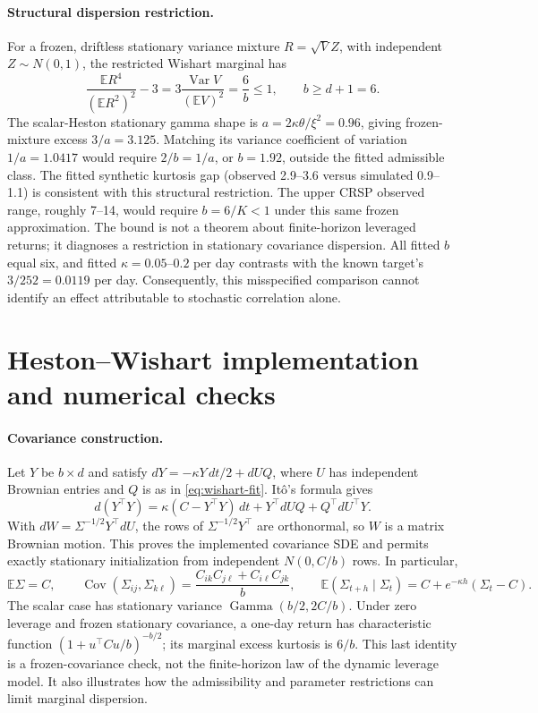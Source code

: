 \documentclass[11pt]{article}
\theoremstyle{definition}\newtheorem{definition}[theorem]{Definition}
\theoremstyle{remark}\newtheorem{remark}[theorem]{Remark}
\newcommand{\E}{\mathbb E}\newcommand{\Prob}{\mathbb P}\newcommand{\R}{\mathbb R}
\begin{document}
\paragraph{Structural dispersion restriction.}
For a frozen, driftless stationary variance mixture $R=\sqrt V Z$, with independent $Z\sim N(0,1)$, the restricted Wishart marginal has
\[
\frac{\E R^4}{(\E R^2)^2}-3
=3\frac{\operatorname{Var}V}{(\E V)^2}=\frac6b\le1,
\qquad b\ge d+1=6.
\]
The scalar-Heston stationary gamma shape is $a=2\kappa\theta/\xi^2=0.96$, giving frozen-mixture excess $3/a=3.125$. Matching its variance coefficient of variation $1/a=1.0417$ would require $2/b=1/a$, or $b=1.92$, outside the fitted admissible class. The fitted synthetic kurtosis gap (observed 2.9--3.6 versus simulated 0.9--1.1) is consistent with this structural restriction. The upper CRSP observed range, roughly 7--14, would require $b=6/K<1$ under this same frozen approximation. The bound is not a theorem about finite-horizon leveraged returns; it diagnoses a restriction in stationary covariance dispersion. All fitted $b$ equal six, and fitted $\kappa=0.05$--$0.2$ per day contrasts with the known target's $3/252=0.0119$ per day. Consequently, this misspecified comparison cannot identify an effect attributable to stochastic correlation alone.

\section{Heston--Wishart implementation and numerical checks}\label{sec:wishart-numerics}
\paragraph{Covariance construction.}
Let $Y$ be $b\times d$ and satisfy $dY=-\kappa Y\,dt/2+dUQ$, where $U$ has independent Brownian entries and $Q$ is as in \eqref{eq:wishart-fit}. It\^o's formula gives
\[
d(Y^\top Y)=\kappa(C-Y^\top Y)\,dt+Y^\top dUQ+Q^\top dU^\top Y.
\]
With $dW=\Sigma^{-1/2}Y^\top dU$, the rows of $\Sigma^{-1/2}Y^\top$ are orthonormal, so $W$ is a matrix Brownian motion. This proves the implemented covariance SDE and permits exactly stationary initialization from independent $N(0,C/b)$ rows. In particular,
\[
\mathbb E\Sigma=C,\qquad
\operatorname{Cov}(\Sigma_{ij},\Sigma_{k\ell})=
\frac{C_{ik}C_{j\ell}+C_{i\ell}C_{jk}}{b},\qquad
\mathbb E(\Sigma_{t+h}\mid\Sigma_t)=C+e^{-\kappa h}(\Sigma_t-C).
\]
The scalar case has stationary variance $\operatorname{Gamma}(b/2,2C/b)$. Under zero leverage and frozen stationary covariance, a one-day return has characteristic function $(1+u^\top Cu/b)^{-b/2}$; its marginal excess kurtosis is $6/b$. This last identity is a frozen-covariance check, not the finite-horizon law of the dynamic leverage model. It also illustrates how the admissibility and parameter restrictions can limit marginal dispersion.
\end{document}
